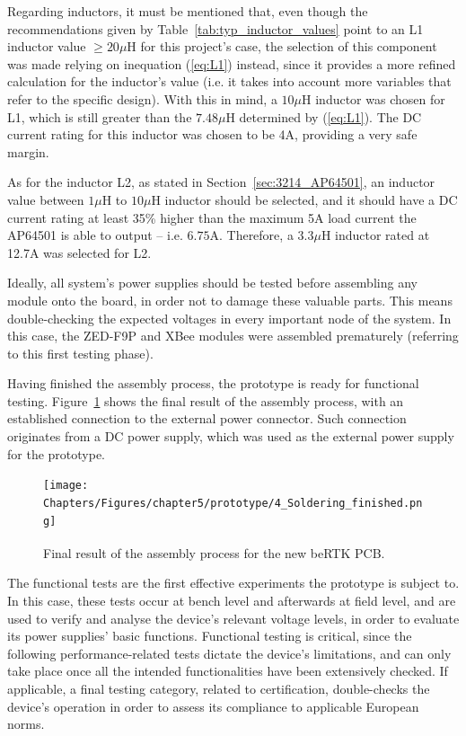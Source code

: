 Regarding inductors, it must be mentioned that, even though the recommendations given by Table~\ref{tab:typ_inductor_values} point to an L1 inductor value $\geq 20 \mu$H for this project's case, the selection of this component was made relying on inequation (\ref{eq:L1}) instead, since it provides a more refined calculation for the inductor's value (i.e. it takes into account more variables that refer to the specific design). With this in mind, a $10 \mu$H inductor was chosen for L1, which is still greater than the $7.48 \mu$H determined by (\ref{eq:L1}). The DC current rating for this inductor was chosen to be 4A, providing a very safe margin.

As for the inductor L2, as stated in Section~\ref{sec:3214_AP64501}, an inductor value between $1 \mu$H to $10 \mu$H inductor should be selected, and it should have a DC current rating at least 35\% higher than the maximum 5A load current the AP64501 is able to output -- i.e. $6.75$A. Therefore, a $3.3 \mu$H inductor rated at 12.7A was selected for L2.

Ideally, all system's power supplies should be tested before assembling any module onto the board, in order not to damage these valuable parts. This means double-checking the expected voltages in every important node of the system. In this case, the ZED-F9P and XBee modules were assembled prematurely (referring to this first testing phase).

Having finished the assembly process, the prototype is ready for functional testing. Figure~\ref{fig:4_Soldering_finished} shows the final result of the assembly process, with an established connection to the external power connector.
Such connection originates from a DC power supply, which was used as the external power supply for the prototype.

\begin{figure}[h]
	\centering
	\texttt{[image: Chapters/Figures/chapter5/prototype/4\_Soldering\_finished.png]}
	\caption{Final result of the assembly process for the new beRTK\textsuperscript{\textregistered} PCB.}
	\label{fig:4_Soldering_finished}
\end{figure}%

The functional tests are the first effective experiments the prototype is subject to. In this case, these tests occur at bench level and afterwards at field level, and are used to verify and analyse the device's relevant voltage levels, in order to evaluate its power supplies' basic functions. Functional testing is critical, since the following performance-related tests dictate the device's limitations, and can only take place once all the intended functionalities have been extensively checked. If applicable, a final testing category, related to certification, double-checks the device's operation in order to assess its compliance to applicable European norms.

